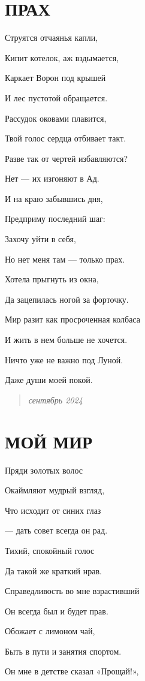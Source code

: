 \documentclass[
  a5paperpaper,
  DIV=11,
  numbers=noendperiod]{scrreprt}
\begin{document}
\section{ПРАХ}\label{ux43fux440ux430ux445}

Струятся отчаянья капли,

Кипит котелок, аж вздымается,

Каркает Ворон под крышей

И лес пустотой обращается.

Рассудок оковами плавится,

Твой голос сердца отбивает такт.

Разве так от чертей избавляются?

Нет --- их изгоняют в Ад.

И на краю забывшись дня,

Предприму последний шаг:

Захочу уйти в себя,

Но нет меня там --- только прах.

Хотела прыгнуть из окна,

Да зацепилась ногой за форточку.

Мир разит как просроченная колбаса

И жить в нем больше не хочется.

Ничто уже не важно под Луной.

Даже души моей покой.

\begin{quote}
\emph{сентябрь 2024}
\end{quote}

\section{МОЙ МИР}\label{ux43cux43eux439-ux43cux438ux440}

Пряди золотых волос

Окаймляют мудрый взгляд,

Что исходит от синих глаз

--- дать совет всегда он рад.

Тихий, спокойный голос

Да такой же краткий нрав.

Справедливость во мне взрастивший

Он всегда был и будет прав.

Обожает с лимоном чай,

Быть в пути и занятия спортом.

Он мне в детстве сказал «Прощай!»,
\end{document}
